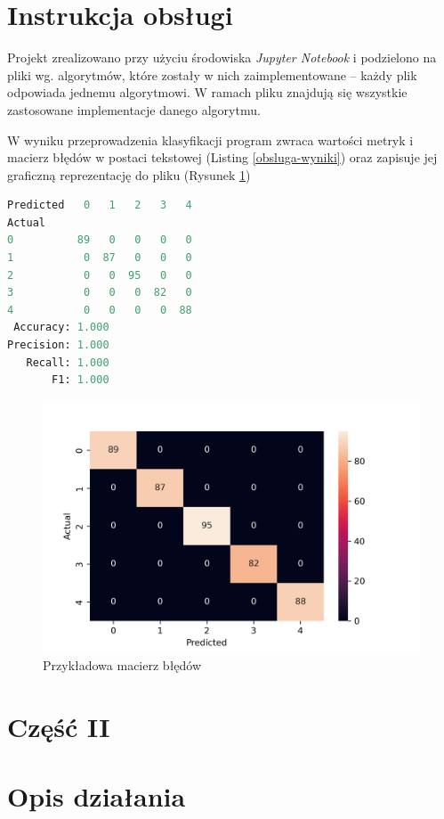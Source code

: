\documentclass[12pt,a4paper]{article}
\begin{document}
	\section{Instrukcja obsługi}
    	Projekt zrealizowano przy użyciu środowiska \textit{Jupyter Notebook} i podzielono na pliki wg. algorytmów, które zostały w nich zaimplementowane -- każdy plik odpowiada jednemu algorytmowi. W ramach pliku znajdują się wszystkie zastosowane implementacje danego algorytmu.
    	
    	W wyniku przeprowadzenia klasyfikacji program zwraca wartości metryk i macierz błędów w postaci tekstowej (Listing \ref{obsluga-wyniki}) oraz zapisuje jej graficzną reprezentację do pliku (Rysunek \ref{fig:conf-matrix})
    	
    	\begin{lstlisting}[language=Python, caption=Przykładowe wyniki oceny algorytmu, label=obsluga-wyniki]
Predicted   0   1   2   3   4
Actual                       
0          89   0   0   0   0
1           0  87   0   0   0
2           0   0  95   0   0
3           0   0   0  82   0
4           0   0   0   0  88
 Accuracy: 1.000
Precision: 1.000
   Recall: 1.000
       F1: 1.000
		\end{lstlisting}
	    
		\pagebreak
	    \begin{figure}[h!]
			\center	
			\includegraphics[width=.75\textwidth]{img/KNNplotNorm-SKLearn.png}
			\caption{Przykładowa macierz błędów}
			\label{fig:conf-matrix}
		\end{figure}
	
	\newpage
    \section*{Część II}
    
	\section{Opis działania}
\end{document}
